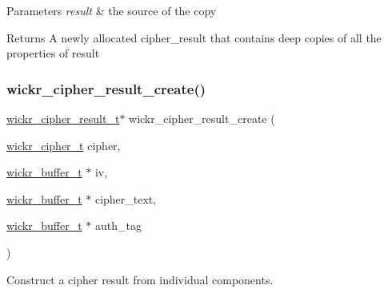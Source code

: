 \begin{DoxyParams}{Parameters}
{\em result} & the source of the copy \\
\hline
\end{DoxyParams}
\begin{DoxyReturn}{Returns}
A newly allocated cipher\+\_\+result that contains deep copies of all the properties of \textquotesingle{}result\textquotesingle{} 
\end{DoxyReturn}
\mbox{\label{group__wickr__cipher_ga234b60967d0b3ef0088ca3ac30755dde}} 
\subsubsection{\texorpdfstring{wickr\+\_\+cipher\+\_\+result\+\_\+create()}{wickr\_cipher\_result\_create()}}
{\footnotesize\ttfamily \mbox{\hyperlink{structwickr__cipher__result}{wickr\+\_\+cipher\+\_\+result\+\_\+t}}$\ast$ wickr\+\_\+cipher\+\_\+result\+\_\+create (\begin{DoxyParamCaption}\item[{\mbox{\hyperlink{structwickr__cipher}{wickr\+\_\+cipher\+\_\+t}}}]{cipher,  }\item[{\mbox{\hyperlink{structwickr__buffer}{wickr\+\_\+buffer\+\_\+t}} $\ast$}]{iv,  }\item[{\mbox{\hyperlink{structwickr__buffer}{wickr\+\_\+buffer\+\_\+t}} $\ast$}]{cipher\+\_\+text,  }\item[{\mbox{\hyperlink{structwickr__buffer}{wickr\+\_\+buffer\+\_\+t}} $\ast$}]{auth\+\_\+tag }\end{DoxyParamCaption})}

Construct a cipher result from individual components.


